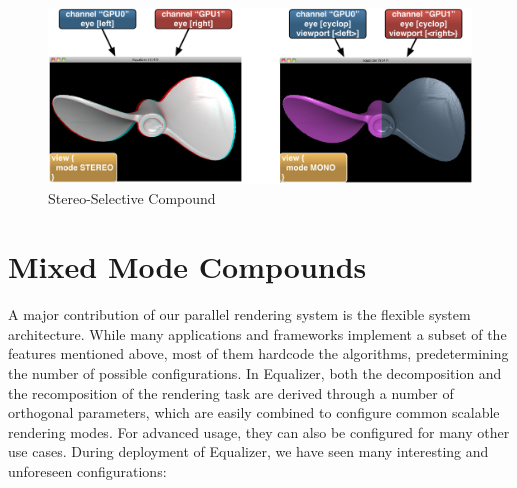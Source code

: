 \begin{figure}[h!t]\center
 \includegraphics[width=\columnwidth]{images/stereoSwitch}
 {\caption{\label{fStereoSwitch}Stereo-Selective Compound}}
\end{figure}

\section{Mixed Mode Compounds}

A major contribution of our parallel rendering system is the flexible system
architecture. While many applications and frameworks implement a subset of the
features mentioned above, most of them hardcode the algorithms, predetermining
the number of possible configurations. In Equalizer, both the decomposition and
the recomposition of the rendering task are derived through a number of
orthogonal parameters, which are easily combined to configure common scalable
rendering modes. For advanced usage, they can also be configured for many other
use cases. During deployment of Equalizer, we have seen many interesting and
unforeseen configurations:

